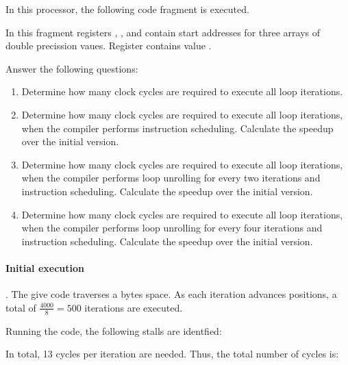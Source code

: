 In this processor, the following code fragment is executed.



In this fragment registers , , and  
contain start addresses for three arrays of double precission vaues.
Register  contains value .

Answer the following questions:

\begin{enumerate}

  \item Determine how many clock cycles are required to execute
        all loop iterations.

  \item Determine how many clock cycles are required to execute all loop iterations,
        when the compiler performs instruction scheduling.
        Calculate the speedup over the initial version.

  \item Determine how many clock cycles are required to execute all loop iterations,
        when the compiler performs loop unrolling for every two iterations and instruction scheduling.
        Calculate the speedup over the initial version.

  \item Determine how many clock cycles are required to execute all loop iterations,
        when the compiler performs loop unrolling for every four iterations and instruction scheduling.
        Calculate the speedup over the initial version.

\end{enumerate}

\begin{acsolution}\end{acsolution}

\paragraph{Initial execution}. 
The give code traverses a  bytes space.
As each iteration advances  positions, 
a total of $\frac{4000}{8} = 500$ iterations are executed.

Running the code, the following stalls are identfied:



In total, 13 cycles per iteration are needed.
Thus, the total number of cycles is:

